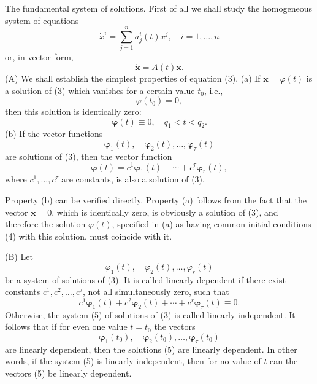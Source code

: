 \documentclass[10pt,a5paper]{book}
\theoremstyle{plain}
\theoremstyle{definition}
\theoremstyle{remark}
\begin{document}
The fundamental system of solutions. First of all we shall study the homogeneous system of equations
\begin{equation*}
\dot{x}^{i}=\sum_{j=1}^{n} a_{j}^{i}(t) x^{j}, \quad i=1, \ldots, n \tag{2}
\end{equation*}
or, in vector form,
\begin{equation*}
\dot{\mathbf{x}}=A(t) \mathbf{x} . \tag{3}
\end{equation*}
(A) We shall establish the simplest properties of equation (3). (a) If $\mathbf{x}=\varphi(t)$ is a solution of (3) which vanishes for a certain value $t_{0}$, i.e.,
\begin{equation*}
\varphi\left(t_{0}\right)=0, \tag{4}
\end{equation*}
then this solution is identically zero:
\[
\boldsymbol{\varphi}(t) \equiv 0, \quad q_{1}<t<q_{2} .
\]
(b) If the vector functions
\[
\boldsymbol{\varphi}_{1}(t), \quad \boldsymbol{\varphi}_{2}(t), \ldots, \boldsymbol{\varphi}_{\tau}(t)
\]
are solutions of (3), then the vector function
\[
\boldsymbol{\varphi}(t)=c^{1} \boldsymbol{\varphi}_{1}(t)+\cdots+c^{\tau} \boldsymbol{\varphi}_{r}(t),
\]
where $c^{1}, \ldots, c^{\tau}$ are constants, is also a solution of (3).

Property (b) can be verified directly. Property (a) follows from the fact that the vector $\mathbf{x}=0$, which is identically zero, is obviously a solution of (3), and therefore the solution $\varphi(t)$, specified in (a) as having common initial conditions (4) with this solution, must coincide with it.

(B) Let
\begin{equation*}
\varphi_{1}(t), \quad \varphi_{2}(t), \ldots, \varphi_{r}(t) \tag{5}
\end{equation*}
be a system of solutions of (3). It is called linearly dependent if there exist constants $c^{1}, c^{2}, \ldots, c^{\tau}$, not all simultaneously zero, such that
\[
c^{1} \boldsymbol{\varphi}_{1}(t)+c^{2} \boldsymbol{\varphi}_{2}(t)+\cdots+c^{r} \boldsymbol{\varphi}_{\tau}(t) \equiv 0 .
\]
Otherwise, the system (5) of solutions of (3) is called linearly independent. It follows that if for even one value $t=t_{0}$ the vectors
\begin{equation*}
\boldsymbol{\varphi}_{1}\left(t_{0}\right), \quad \boldsymbol{\varphi}_{2}\left(t_{0}\right), \ldots, \boldsymbol{\varphi}_{\tau}\left(t_{0}\right) \tag{6}
\end{equation*}
are linearly dependent, then the solutions (5) are linearly dependent. In other words, if the system (5) is linearly independent, then for no value of $t$ can the vectors (5) be linearly dependent.
\end{document}
